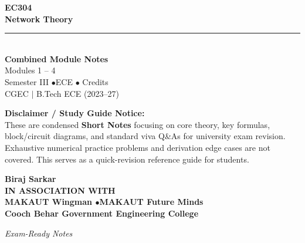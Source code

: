 \documentclass[12pt,a4paper]{article}
\begin{document}
\thispagestyle{empty}


\vspace*{1.0cm}
\begin{center}
  {\Huge\bfseries\color{myred} EC304}\\[10pt]
  {\LARGE\bfseries\color{mydark} Network Theory}\\[20pt]
  {\color{myred}\rule{0.7\linewidth}{1.5pt}}\\[18pt]
  {\Large\color{myteal}\textbf{Combined Module Notes}}\\[8pt]
  {\large\color{mydark} Modules 1 -- 4}\\[40pt]
  {\normalsize\color{mydark} Semester III \quad$\bullet$\quad ECE \quad$\bullet$ Credits}\\[12pt]
  {\normalsize\color{mydark} CGEC \;$|$\; B.Tech ECE (2023--27)}
\end{center}
\vspace{1.0cm}
\begin{center}
  \begin{tcolorbox}[colback=mygray, colframe=mgframe, boxrule=0.5pt, arc=3pt, width=0.85\linewidth]
    \centering\small\color{mydark}
    \textbf{Disclaimer / Study Guide Notice:}\\
    These are condensed \textbf{Short Notes} focusing on core theory, key formulas, block/circuit diagrams, and standard viva Q\&As for university exam revision. Exhaustive numerical practice problems and derivation edge cases are not covered. This serves as a quick-revision reference guide for students.
  \end{tcolorbox}
\end{center}
\vfill
\vspace{0.6cm}
\begin{center}
  {\large\bfseries\color{mypurple} Biraj Sarkar}\\[16pt]
  {\footnotesize\color{watermark}\textbf{IN ASSOCIATION WITH}}\\[8pt]
  {\small\bfseries\color{mydark} MAKAUT Wingman \quad$\bullet$\quad MAKAUT Future Minds}\\[12pt]
  {\large\bfseries\color{myteal} Cooch Behar Government Engineering College}
\end{center}
\vfill
\begin{center}{\small\color{watermark}\textit{Exam-Ready Notes}}\end{center}
\clearpage
\end{document}
